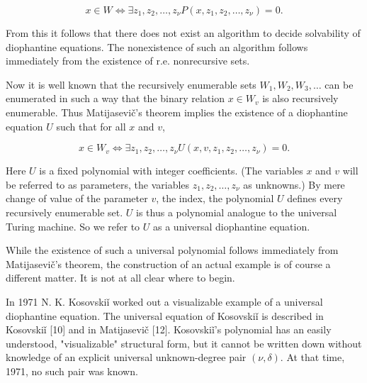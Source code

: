 \documentclass[11pt,a4paper]{article}
\newcommand{\origpage}[1]{\marginnote{\footnotesize\textbf{[#1]}}}
\begin{document}
\[
x \in W \Leftrightarrow \exists z_{1}, z_{2}, \ldots, z_{\nu} P\left(x, z_{1}, z_{2}, \ldots, z_{\nu}\right)=0 .
\]

From this it follows that there does not exist an algorithm to decide solvability of diophantine equations. The nonexistence of such an algorithm follows immediately from the existence of r.e. nonrecursive sets.

Now it is well known that the recursively enumerable sets $W_{1},\allowbreak  W_{2},\allowbreak  W_{3},\allowbreak  \ldots$ can be enumerated in such a way that the binary relation $x \in W_{v}$ is also recursively enumerable. Thus Matijasevič's theorem implies the existence of a diophantine equation $U$ such that for all $x$ and $v$,

\[
x \in W_{v} \Leftrightarrow \exists z_{1}, z_{2}, \ldots, z_{\nu} U\left(x, v, z_{1}, z_{2}, \ldots, z_{\nu}\right)=0 .
\]

Here $U$ is a fixed polynomial with integer coefficients. (The variables $x$ and $v$ will be referred to as parameters, the variables $z_{1},\allowbreak  z_{2},\allowbreak  \ldots,\allowbreak  z_{\nu}$ as unknowns.) By mere change of value of the parameter $v$, the index, the polynomial $U$ defines every recursively enumerable set. $U$ is thus a polynomial analogue to the universal Turing machine. So we refer to $U$ as a universal diophantine equation.

While the existence of such a universal polynomial follows immediately from Matijasevič's theorem, the construction of an actual example is of course a different matter. It is not at all clear where to begin.

\begingroup\renewcommand{\thefootnote}{}\endgroup

\origpage{550}In 1971 N. K. Kosovskiǐ worked out a visualizable example of a universal diophantine equation. The universal equation of Kosovskiǐ is described in Kosovskiǐ [10] and in Matijasevič [12]. Kosovskiǐ's polynomial has an easily understood, "visualizable" structural form, but it cannot be written down without knowledge of an explicit universal unknown-degree pair $(\nu,\allowbreak  \delta)$. At that time, 1971, no such pair was known.
\end{document}
